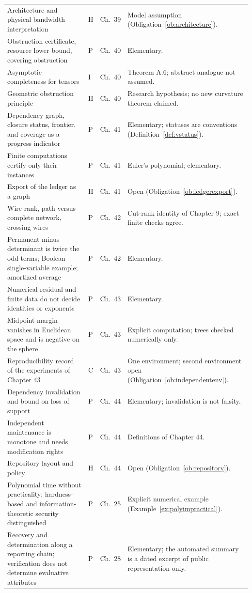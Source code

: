 \documentclass[11pt,letterpaper]{report}
\theoremstyle{plain}
\theoremstyle{definition}
\theoremstyle{remark}
\begin{document}
{\begin{longtable}{p{}p{}p{}p{}}
Architecture and physical bandwidth interpretation & H & Ch.\ 39 & Model assumption (Obligation~\ref{ob:architecture}).\\
Obstruction certificate, resource lower bound, covering obstruction & P & Ch.\ 40 & Elementary.\\
Asymptotic completeness for tensors & I & Ch.\ 40 & Theorem A.6; abstract analogue not assumed.\\
Geometric obstruction principle & H & Ch.\ 40 & Research hypothesis; no new curvature theorem claimed.\\
Dependency graph, closure status, frontier, and coverage as a progress indicator & P & Ch.\ 41 & Elementary; statuses are conventions (Definition~\ref{def:vstatus}).\\
Finite computations certify only their instances & P & Ch.\ 41 & Euler's polynomial; elementary.\\
Export of the ledger as a graph & H & Ch.\ 41 & Open (Obligation~\ref{ob:ledgerexport}).\\
Wire rank, path versus complete network, crossing wires & P & Ch.\ 42 & Cut-rank identity of Chapter 9; exact finite checks agree.\\
Permanent minus determinant is twice the odd terms; Boolean single-variable example; amortized average & P & Ch.\ 42 & Elementary.\\
Numerical residual and finite data do not decide identities or exponents & P & Ch.\ 43 & Elementary.\\
Midpoint margin vanishes in Euclidean space and is negative on the sphere & P & Ch.\ 43 & Explicit computation; trees checked numerically only.\\
Reproducibility record of the experiments of Chapter 43 & C & Ch.\ 43 & One environment; second environment open (Obligation~\ref{ob:independentenv}).\\
Dependency invalidation and bound on loss of support & P & Ch.\ 44 & Elementary; invalidation is not falsity.\\
Independent maintenance is monotone and needs modification rights & P & Ch.\ 44 & Definitions of Chapter 44.\\
Repository layout and policy & H & Ch.\ 44 & Open (Obligation~\ref{ob:repository}).\\
Polynomial time without practicality; hardness-based and information-theoretic security distinguished & P & Ch.\ 25 & Explicit numerical example (Example~\ref{ex:polyimpractical}).\\
Recovery and determination along a reporting chain; verification does not determine evaluative attributes & P & Ch.\ 28 & Elementary; the automated summary is a dated excerpt of public representation only.\\

\end{longtable}}
\end{document}
